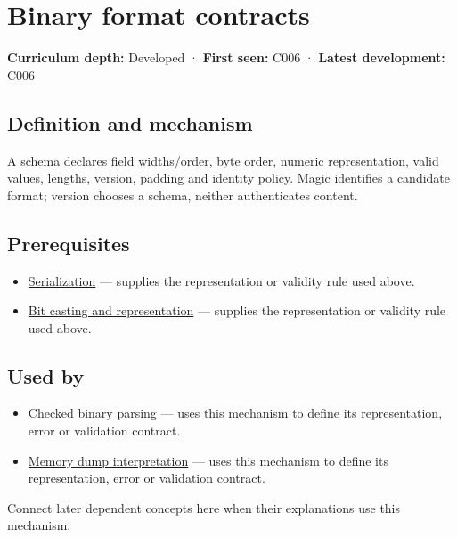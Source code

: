 \hypertarget{appendix-590bbb2424c1}{}
\section{Binary format contracts}\label{appendix-590bbb2424c1-binary-format-contracts}

\textbf{Curriculum depth:} Developed · \textbf{First seen:} C006 · \textbf{Latest development:} C006

\subsection{Definition and mechanism}\label{appendix-590bbb2424c1-definition-and-mechanism}

A schema declares field widths/order, byte order, numeric representation, valid values, lengths, version, padding and identity policy. Magic identifies a candidate format; version chooses a schema, neither authenticates content.

\subsection{Prerequisites}\label{appendix-590bbb2424c1-prerequisites}

\begin{itemize}
\tightlist
\item
  \hyperref[appendix-91d09ebed979]{Serialization} --- supplies the representation or validity rule used above.
\item
  \hyperref[appendix-34ee45f161c1]{Bit casting and representation} --- supplies the representation or validity rule used above.
\end{itemize}

\subsection{Used by}\label{appendix-590bbb2424c1-used-by}

\begin{itemize}
\tightlist
\item
  \hyperref[appendix-652d81568de9]{Checked binary parsing} --- uses this mechanism to define its representation, error or validation contract.
\item
  \hyperref[appendix-230b59c0676b]{Memory dump interpretation} --- uses this mechanism to define its representation, error or validation contract.
\end{itemize}

Connect later dependent concepts here when their explanations use this mechanism.

